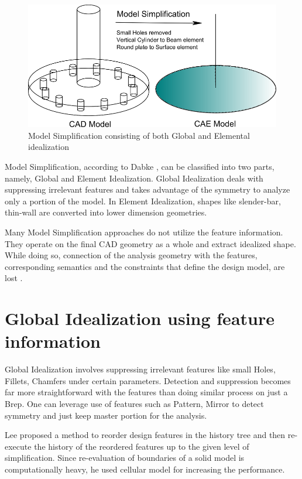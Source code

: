 	\begin{figure} [h]
		\centering
		\includegraphics[width=0.9\linewidth]{..//Common/images/ModelSimplification.png}
		\vspace{\abovecaptionskip}
		\caption{Model Simplification consisting of both Global and Elemental idealization}
		\label{ModelSimplification}
	\end{figure}

	Model Simplification, according to Dabke \cite{Dabke1994}, can be classified into two parts, namely, Global and Element Idealization. Global Idealization deals with suppressing irrelevant features and takes advantage of the symmetry to analyze only a portion of the model. In Element Idealization, shapes like slender-bar, thin-wall are converted into lower dimension geometries. 

	Many Model Simplification  approaches do not utilize the feature information. They operate on the final CAD geometry as a whole and extract idealized shape. While doing so, connection of the analysis geometry with the features, corresponding semantics and the constraints that define the design model, are lost \cite{Smit2011}.
	
	
\section{Global Idealization using feature information}
	
	Global Idealization involves suppressing irrelevant features like small Holes, Fillets, Chamfers under certain parameters. Detection and suppression becomes far more straightforward with the features than doing similar process on just a Brep. One can leverage use of features such as Pattern, Mirror to detect symmetry and just keep master portion for the analysis. 

	 Lee \cite{Lee2005} proposed a method to reorder design features in the history tree and then re-execute the history of the reordered features up to the given level of simplification. Since re-evaluation of boundaries of a solid model is computationally heavy, he used cellular model for increasing the performance.

